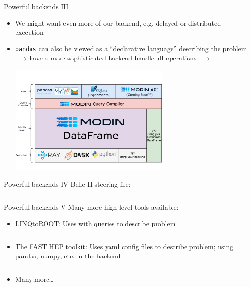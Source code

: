 \begin{frame}{Powerful backends III}
	\begin{itemize}
		\item We might want even more of our backend, e.g. delayed or distributed execution
		\item \texttt{pandas} can also be viewed as a \enquote{declarative language} describing the problem $\longrightarrow$ have a more sophisticated backend handle all operations $\longrightarrow$ 
		
		\includegraphics[width=8cm, trim=0cm 2.5cm 0cm 2.5cm, clip]{figures/paradigms/dp/modin_architecture.png}
	\end{itemize}
\end{frame}
%
\begin{frame}{Powerful backends IV}
	Belle II steering file:
	\inputminted{python}{code/paradigms/dp/belle2_steering_file.py}
\end{frame}
%
\begin{frame}{Powerful backends V}
	Many more high level tools available:
	\smallskip 
	\begin{itemize}
		\item LINQtoROOT: Uses  with  queries to describe problem
		\inputminted[fontsize=\small]{csharp}{code/paradigms/dp/linqtoroot.cs}
		\item The FAST HEP toolkit: Uses yaml config files to describe problem; using pandas, numpy, etc. in the backend
		\inputminted[fontsize=\small]{yaml}{code/paradigms/dp/fast.yaml}
		\item Many more\dots
	\end{itemize}
\end{frame}